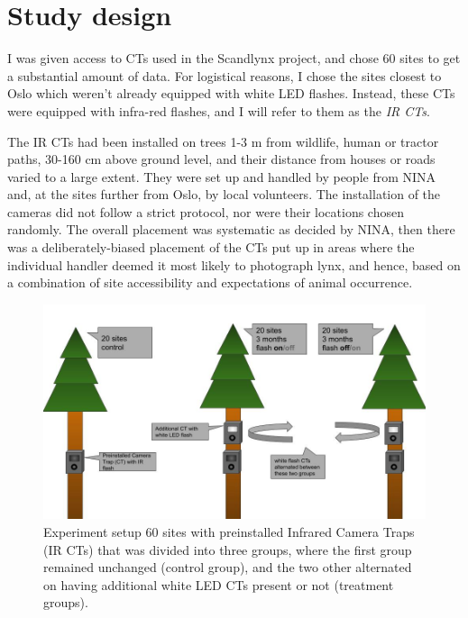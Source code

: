 \section{Study design} 

I was given access to CTs used in the Scandlynx project, and chose 60 sites to get a substantial amount of data.
For logistical reasons, I chose the sites closest to Oslo which weren't already equipped with white LED flashes. 
Instead, these CTs were equipped with infra-red flashes, and I will refer to them as the \emph{IR CTs}.


The IR CTs had been installed on trees 1-3 m from wildlife, human or tractor paths, 30-160 cm above ground level, and their distance from houses or roads varied to a large extent.
They were set up and handled by people from NINA and, at the sites further from Oslo, by local volunteers. %
The installation of the cameras did not follow a strict protocol, nor were their locations chosen randomly. The overall placement was systematic as decided by NINA, then there was a deliberately-biased placement of the CTs put up in areas where the individual handler deemed it most likely to photograph lynx, and hence, based on a combination of site accessibility and expectations of animal occurrence. %


\begin{figure}
    \begin{center}
    	\includegraphics[scale=0.4]{./img/experiment_setup.jpg} %
    \end{center}
\caption[The Experimental setup]
    	{Experiment setup %
    	 60 sites with preinstalled Infrared Camera Traps (IR CTs) that was divided into three groups, where the first group remained unchanged (control group), and the two other alternated on having additional white LED CTs present or not (treatment groups).}
    \label{fig:exp_set}
\end{figure} 


